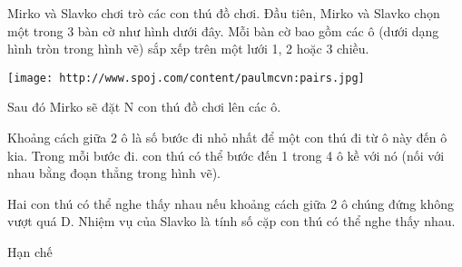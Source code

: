 Mirko và Slavko chơi trò các con thú đồ chơi. Đầu tiên, Mirko và Slavko chọn một trong 3 bàn cờ như hình dưới đây. Mỗi bàn cờ bao gồm các ô (dưới dạng hình tròn trong hình vẽ) sắp xếp trên một lưới 1, 2 hoặc 3 chiều.  


\texttt{[image: http://www.spoj.com/content/paulmcvn:pairs.jpg]}

   Sau đó Mirko sẽ đặt N con thú đồ chơi lên các ô.  

   Khoảng cách giữa 2 ô là số bước đi nhỏ nhất để một con thú đi từ ô này đến ô kia. Trong mỗi bước đi. con thú có thể bước đến 1 trong 4 ô kề với nó (nối với nhau bằng đoạn thẳng trong hình vẽ).  

   Hai con thú có thể nghe thấy nhau nếu khoảng cách giữa 2 ô chúng đứng không vượt quá D. Nhiệm vụ của Slavko là tính số cặp con thú có thể nghe thấy nhau.  

Hạn chế